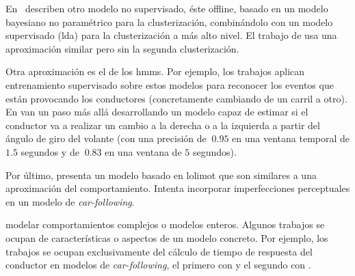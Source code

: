En~\cite{bando2013unsupervised} describen otro modelo no supervisado, éste offline, basado en un modelo bayesiano no paramétrico para la clusterización, combinándolo con un modelo supervisado (\gls{lda}) para la clusterización a más alto nivel. El trabajo de \cite{bender2015unsupervised} usa una aproximación similar pero sin la segunda clusterización.

Otra aproximación es el de los \glspl{hmm}. Por ejemplo, los trabajos \cite{Kuge2000,sekizawa2007modeling} aplican entrenamiento supervisado sobre estos modelos para reconocer los eventos que están provocando los conductores (concretamente cambiando de un carril a otro). En \cite{Hou2011} van un paso más allá desarrollando un modelo capaz de estimar si el conductor va a realizar un cambio a la derecha o a la izquierda a partir del ángulo de giro del volante (con una precisión de $~0.95$ en una ventana temporal de $1.5$ segundos y de $~0.83$ en una ventana de $5$ segundos).

Por último, \cite{Aghabayk2013} presenta un modelo basado en \gls{lolimot} que son similares a una aproximación \textit{} del comportamiento. Intenta incorporar imperfecciones perceptuales en un modelo de \textit{\gls{car-following}}.

 modelar comportamientos complejos o modelos enteros. Algunos trabajos se ocupan de características o aspectos de un modelo concreto. Por ejemplo, los trabajos \cite{Hatipkarasulu2002, zheng2013} se ocupan exclusivamente del cálculo de tiempo de respuesta del conductor en modelos de \textit{\gls{car-following}}, el primero con  y el segundo con .